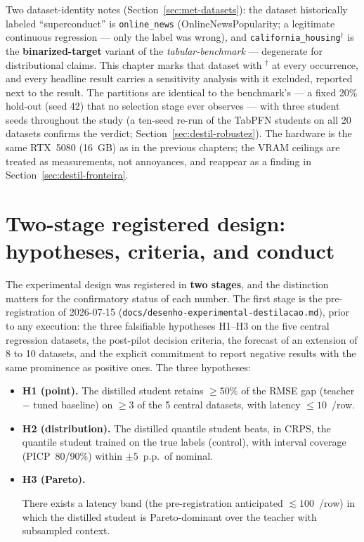 \begin{sloppypar}
Two dataset-identity notes
(Section~\ref{sec:met-datasets}): the dataset historically labeled
``superconduct'' is \texttt{online\_news} (OnlineNewsPopularity; a
legitimate continuous regression --- only the label was wrong), and
\texttt{california\_\allowbreak housing}$^\dagger$ is the
\textbf{binarized-target} variant of the \emph{tabular-benchmark}
--- degenerate for distributional claims. This chapter marks that
dataset with $^\dagger$ at every occurrence, and every headline
result carries a sensitivity analysis with it excluded, reported
next to the result. The partitions are identical to the
benchmark's --- a fixed 20\% hold-out (seed 42) that no selection
stage ever observes --- with three student seeds throughout the
study (a ten-seed re-run of the TabPFN students on all 20 datasets
confirms the verdict; Section~\ref{sec:destil-robustez}). The
hardware is the same RTX~5080
(16~GB) as in the previous chapters; the VRAM ceilings are treated as measurements, not
annoyances, and reappear as a finding in
Section~\ref{sec:destil-fronteira}.
\end{sloppypar}

\section{Two-stage registered design: hypotheses, criteria, and conduct}
\label{sec:destil-desenho}

The experimental design was registered in \textbf{two stages}, and
the distinction matters for the confirmatory status of each number.
The first stage is the pre-registration of 2026-07-15
(\texttt{docs/}\allowbreak\texttt{desenho-experimental-destilacao.md}),
prior to any execution: the three falsifiable hypotheses H1--H3 on
the five central regression datasets, the post-pilot decision
criteria, the forecast of an extension of 8 to 10 datasets, and the
explicit commitment to report negative results with the same
prominence as positive ones. The three hypotheses:

\begin{itemize}
  \item \textbf{H1 (point).} The distilled student retains
    $\geq 50\%$ of the RMSE gap (teacher $-$ tuned baseline) on
    $\geq 3$ of the 5 central datasets, with latency
    $\leq 10$~\us/row.
  \item \textbf{H2 (distribution).} The distilled quantile student
    beats, in CRPS, the quantile student trained on the true labels
    (control), with interval coverage (PICP~80/90\%) within
    $\pm 5$~p.p.\ of nominal.
  \item \textbf{H3 (Pareto).} {\sloppy There exists a latency band (the
    pre-registration anticipated ${\lesssim}100$~\us/row) in which
    the distilled student is Pareto-dominant over the teacher with
    subsampled context.\par}
\end{itemize}

